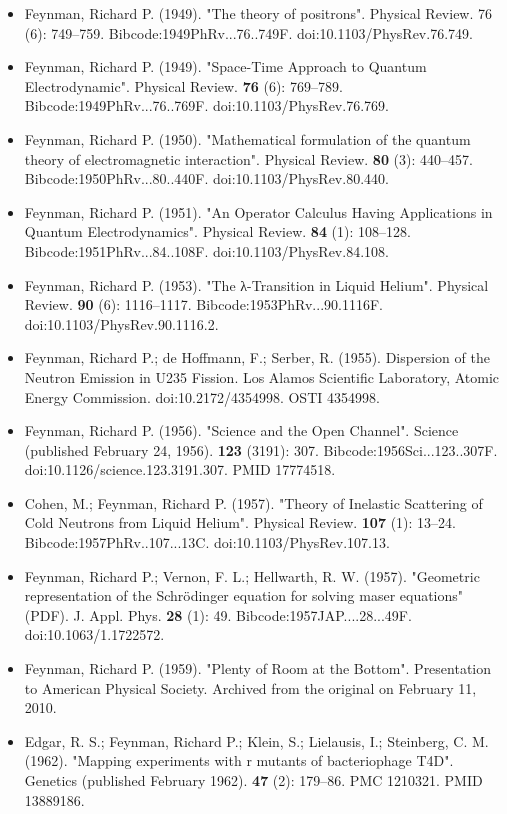 \begin{itemize}
\item Feynman, Richard P. (1949). "The theory of positrons". Physical Review. 76 (6): 749–759. Bibcode:1949PhRv...76..749F. doi:10.1103/PhysRev.76.749.
\item Feynman, Richard P. (1949). "Space-Time Approach to Quantum Electrodynamic". Physical Review. \textbf{76} (6): 769–789. Bibcode:1949PhRv...76..769F. doi:10.1103/PhysRev.76.769.
\item Feynman, Richard P. (1950). "Mathematical formulation of the quantum theory of electromagnetic interaction". Physical Review. \textbf{80} (3): 440–457. Bibcode:1950PhRv...80..440F. doi:10.1103/PhysRev.80.440.
\item Feynman, Richard P. (1951). "An Operator Calculus Having Applications in Quantum Electrodynamics". Physical Review. \textbf{84} (1): 108–128. Bibcode:1951PhRv...84..108F. doi:10.1103/PhysRev.84.108.
\item Feynman, Richard P. (1953). "The λ-Transition in Liquid Helium". Physical Review. \textbf{90} (6): 1116–1117. Bibcode:1953PhRv...90.1116F. doi:10.1103/PhysRev.90.1116.2.
\item Feynman, Richard P.; de Hoffmann, F.; Serber, R. (1955). Dispersion of the Neutron Emission in U235 Fission. Los Alamos Scientific Laboratory, Atomic Energy Commission. doi:10.2172/4354998. OSTI 4354998.
\item Feynman, Richard P. (1956). "Science and the Open Channel". Science (published February 24, 1956). \textbf{123} (3191): 307. Bibcode:1956Sci...123..307F. doi:10.1126/science.123.3191.307. PMID 17774518.
\item Cohen, M.; Feynman, Richard P. (1957). "Theory of Inelastic Scattering of Cold Neutrons from Liquid Helium". Physical Review. \textbf{107} (1): 13–24. Bibcode:1957PhRv..107...13C. doi:10.1103/PhysRev.107.13.
\item Feynman, Richard P.; Vernon, F. L.; Hellwarth, R. W. (1957). "Geometric representation of the Schrödinger equation for solving maser equations" (PDF). J. Appl. Phys. \textbf{28} (1): 49. Bibcode:1957JAP....28...49F. doi:10.1063/1.1722572.
\item Feynman, Richard P. (1959). "Plenty of Room at the Bottom". Presentation to American Physical Society. Archived from the original on February 11, 2010.
\item Edgar, R. S.; Feynman, Richard P.; Klein, S.; Lielausis, I.; Steinberg, C. M. (1962). "Mapping experiments with r mutants of bacteriophage T4D". Genetics (published February 1962). \textbf{47} (2): 179–86. PMC 1210321. PMID 13889186.

\end{itemize}
